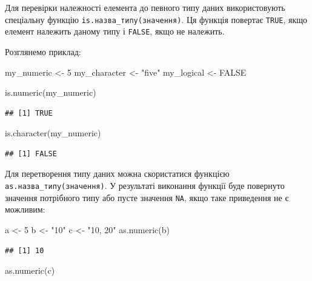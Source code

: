\documentclass[
]{book}
\newenvironment{Shaded}{\begin{snugshade}}{\end{snugshade}}
\newcommand{\ConstantTok}[1]{\textcolor[rgb]{0.00,0.00,0.00}{#1}}
\newcommand{\DecValTok}[1]{\textcolor[rgb]{0.00,0.00,0.81}{#1}}
\newcommand{\FunctionTok}[1]{\textcolor[rgb]{0.00,0.00,0.00}{#1}}
\newcommand{\NormalTok}[1]{#1}
\newcommand{\OtherTok}[1]{\textcolor[rgb]{0.56,0.35,0.01}{#1}}
\newcommand{\StringTok}[1]{\textcolor[rgb]{0.31,0.60,0.02}{#1}}
\begin{document}
Для перевірки належності елемента до певного типу даних використовують спеціальну функцію \texttt{is.назва\_типу(значення)}. Ця функція повертає \texttt{TRUE}, якщо елемент належить даному типу і \texttt{FALSE}, якщо не належить.

Розглянемо приклад:

\begin{Shaded}
\begin{Highlighting}[]
\NormalTok{my\_numeric }\OtherTok{\textless{}{-}} \DecValTok{5}
\NormalTok{my\_character }\OtherTok{\textless{}{-}} \StringTok{"five"}
\NormalTok{my\_logical }\OtherTok{\textless{}{-}} \ConstantTok{FALSE}

\FunctionTok{is.numeric}\NormalTok{(my\_numeric)}
\end{Highlighting}
\end{Shaded}

\begin{verbatim}
## [1] TRUE
\end{verbatim}

\begin{Shaded}
\begin{Highlighting}[]
\FunctionTok{is.character}\NormalTok{(my\_numeric)}
\end{Highlighting}
\end{Shaded}

\begin{verbatim}
## [1] FALSE
\end{verbatim}

Для перетворення типу даних можна скористатися функцією \texttt{as.назва\_типу(значення)}. У результаті виконання функції буде повернуто значення потрібного типу або пусте значення \texttt{NA}, якщо таке приведення не є можливим:

\begin{Shaded}
\begin{Highlighting}[]
\NormalTok{a }\OtherTok{\textless{}{-}} \DecValTok{5}
\NormalTok{b }\OtherTok{\textless{}{-}} \StringTok{"10"}
\NormalTok{c }\OtherTok{\textless{}{-}} \StringTok{"10, 20"}
\FunctionTok{as.numeric}\NormalTok{(b)}
\end{Highlighting}
\end{Shaded}

\begin{verbatim}
## [1] 10
\end{verbatim}

\begin{Shaded}
\begin{Highlighting}[]
\FunctionTok{as.numeric}\NormalTok{(c)}
\end{Highlighting}
\end{Shaded}
\end{document}
